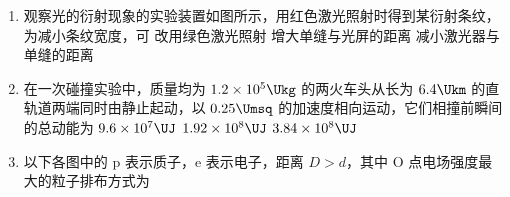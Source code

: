 \documentclass[\gkver]{gaokaozhenti}
\begin{document}
\begin{enumerate}
{选项 A 的情况中，$\Delta\Phi = \Phi_{\text{I}} - \Phi_{\text{II}}$；

选项 B 的情况中，$\Delta\Phi = \Phi_{\text{I}} + \Phi_{\text{II}}$；

选项 C 的情况中，$\Delta\Phi = \Phi_{\text{I}} - \Phi_{\text{I}} = 0$；

选项 D 的情况中，$\Delta\Phi = \Phi_{\text{I}} + \Phi_{\text{I}}$；

正确选项为 D。
}

\item
观察光的衍射现象的实验装置如图所示，用红色激光照射时得到某衍射条纹，为减小条纹宽度，可
\onepicture[w=6.22cm]{}
{改用绿色激光照射}
{增大单缝与光屏的距离}
{减小激光器与单缝的距离}

\item
在一次碰撞实验中，质量均为 $1.2 \times 10^{5}\Ukg$ 的两火车头从长为 $6.4\Ukm$ 的直轨道两端同时由静止起动，以 $0.25\Umsq$ 的加速度相向运动，它们相撞前瞬间的总动能为
{$9.6 \times 10^{7}\UJ$}
{$1.92 \times 10^{8}\UJ$}
{$3.84 \times 10^{8}\UJ$}

\item
以下各图中的 p 表示质子，e 表示电子，距离 $D > d$，其中 O 点电场强度最大的粒子排布方式为
\fourchoices[answer=C, ispicture=true, wA=3.46cm, wB=3.46cm, wC=3.41cm, wD=3.44cm]
{}
{}
{}
{}


\end{enumerate}
\end{document}

